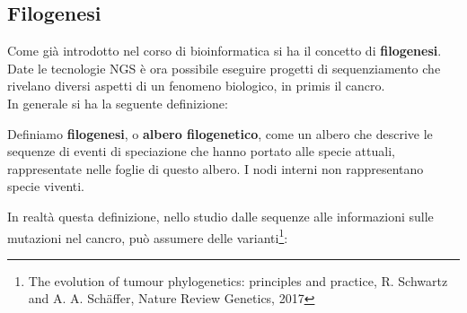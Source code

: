 \documentclass[a4paper,12pt, oneside]{book}
\begin{document}
\subsection{Filogenesi}
Come già introdotto nel corso di bioinformatica si ha il concetto di
\textbf{filogenesi}. Date le tecnologie NGS è ora possibile eseguire progetti di
sequenziamento che rivelano diversi aspetti di un fenomeno biologico, in primis
il cancro.\\
In generale si ha la seguente definizione:
\begin{definizione}
  Definiamo \textbf{filogenesi}, o \textbf{albero filogenetico}, come un albero
  che descrive le sequenze di eventi di speciazione che hanno portato alle
  specie attuali, rappresentate nelle foglie di questo albero. I nodi interni
  non rappresentano specie viventi.
\end{definizione}
In realtà questa definizione, nello studio dalle sequenze alle informazioni
sulle mutazioni nel cancro, può assumere delle varianti\footnote{The evolution
  of tumour phylogenetics: principles and practice, R. Schwartz and
  A. A. Schäffer, Nature Review Genetics, 2017}:
\end{document}
